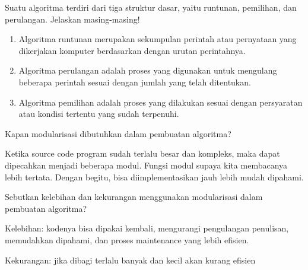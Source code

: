 \documentclass[
  12pt,
  answers  
]{exam}
\begin{document}
\begin{questions}
		\question Suatu algoritma terdiri dari tiga struktur dasar, yaitu runtunan, pemilihan, dan perulangan. Jelaskan masing-masing!
	\begin{solution}
		\begin{enumerate}
			\item Algoritma runtunan merupakan sekumpulan perintah atau pernyataan yang dikerjakan komputer berdasarkan dengan urutan perintahnya.
			\item Algoritma perulangan adalah proses yang digunakan untuk mengulang beberapa perintah sesuai dengan jumlah yang telah ditentukan.
			\item Algoritma pemilihan adalah proses yang dilakukan sesuai dengan persyaratan atau kondisi tertentu yang sudah terpenuhi.
		\end{enumerate}
	\end{solution}
	\question Kapan modularisasi dibutuhkan dalam pembuatan algoritma?
	\begin{solution}
		Ketika source code program sudah terlalu besar dan kompleks, maka dapat dipecahkan menjadi beberapa modul. Fungsi modul supaya kita membacanya lebih tertata. Dengan begitu, bisa diimplementasikan jauh lebih mudah dipahami.
	\end{solution}
	\question Sebutkan kelebihan dan kekurangan menggunakan modularisasi dalam pembuatan algoritma? 
	\begin{solution}
		\newline
		Kelebihan: kodenya bisa dipakai kembali, mengurangi pengulangan penulisan, memudahkan dipahami, dan proses maintenance yang lebih efisien. 

		Kekurangan: jika dibagi terlalu banyak dan kecil akan kurang efisien
	\end{solution}
	\end{questions}
	\pagebreak
\end{document}
